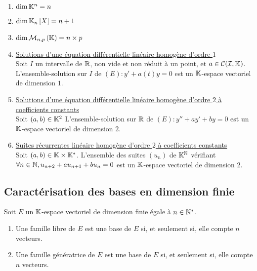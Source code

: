 \begin{defprop}
    \begin{enumerate}
        \item \(\dim{\mathbb{K}^n} = n\)
        \item \(\dim{\mathbb{K}_n\left[X\right]} = n + 1\)
        \item \(\dim{\M{n,p}} = n \times p\)
        \item \underline{Solutions d’une équation différentielle linéaire homogène d’ordre \(1\)}\\
            Soit \(I\) un intervalle de \(\mathbb{R}\), non vide et non réduit à un point, et \(a \in \mathcal{C(I, \mathbb{K})}\).
            L’ensemble-solution sur \(I\) de \((E) : y' + a(t)y = 0\) est un \(\mathbb{K}\)-espace vectoriel de dimension \(1\).
        \item \underline{Solutions d’une équation différentielle linéaire homogène d’ordre \(2\) à coefficients constants}\\
            Soit \((a, b) \in \mathbb{K}^2\)
            L’ensemble-solution sur \(\mathbb{R}\) de \((E) : y'' + ay' + by = 0\) est un \(\mathbb{K}\)-espace vectoriel de dimension \(2\).
        \item \underline{Suites récurrentes linéaire homogène d’ordre \(2\) à coefficients constants}\\
            Soit \((a, b) \in \mathbb{K} \times \mathbb{K}^*\). L’ensemble des suites \((u_n)\) de \(\mathbb{K}^{\mathbb{N}}\) vérifiant\( \forall n \in \mathbb{N}, u_{n+2} + au_{n+1} + bu_n = 0\) est un \(\mathbb{K}\)-espace vectoriel de dimension \(2\).
    \end{enumerate}
\end{defprop}

\subsection{Caractérisation des bases en dimension finie}
\begin{defprop}
    Soit \(E\) un \(\mathbb{K}\)-espace vectoriel de dimension finie égale à \(n \in \mathbb{N}^*\).
    \begin{enumerate}
        \item Une famille libre de \(E\) est une base de \(E\) si, et seulement si, elle compte \(n\) vecteurs.
        \item Une famille génératrice de \(E\) est une base de \(E\) si, et seulement si, elle compte \(n\) vecteurs.
    \end{enumerate}
\end{defprop}

